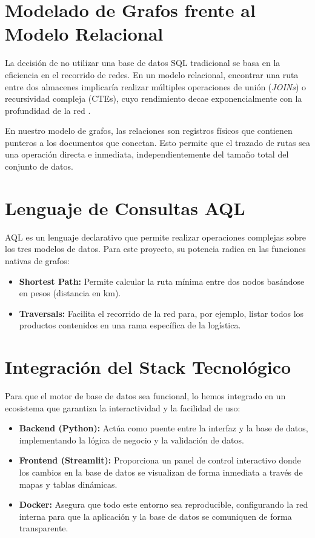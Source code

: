 \section{Modelado de Grafos frente al Modelo Relacional}
La decisión de no utilizar una base de datos SQL tradicional se basa en la eficiencia en el recorrido de redes. En un modelo relacional, encontrar una ruta entre dos almacenes implicaría realizar múltiples operaciones de unión (\textit{JOINs}) o recursividad compleja (CTEs), cuyo rendimiento decae exponencialmente con la profundidad de la red \cite{borrego2021}.

En nuestro modelo de grafos, las relaciones son registros físicos que contienen punteros a los documentos que conectan. Esto permite que el trazado de rutas sea una operación directa e inmediata, independientemente del tamaño total del conjunto de datos.

\section{Lenguaje de Consultas AQL}
AQL es un lenguaje declarativo que permite realizar operaciones complejas sobre los tres modelos de datos. Para este proyecto, su potencia radica en las funciones nativas de grafos:
\begin{itemize}
    \item \textbf{Shortest Path:} Permite calcular la ruta mínima entre dos nodos basándose en pesos (distancia en km).
    \item \textbf{Traversals:} Facilita el recorrido de la red para, por ejemplo, listar todos los productos contenidos en una rama específica de la logística.
\end{itemize}

\section{Integración del Stack Tecnológico}
Para que el motor de base de datos sea funcional, lo hemos integrado en un ecosistema que garantiza la interactividad y la facilidad de uso:
\begin{itemize}
    \item \textbf{Backend (Python):} Actúa como puente entre la interfaz y la base de datos, implementando la lógica de negocio y la validación de datos.
    \item \textbf{Frontend (Streamlit):} Proporciona un panel de control interactivo donde los cambios en la base de datos se visualizan de forma inmediata a través de mapas y tablas dinámicas.
    \item \textbf{Docker:} Asegura que todo este entorno sea reproducible, configurando la red interna para que la aplicación y la base de datos se comuniquen de forma transparente.
\end{itemize}
